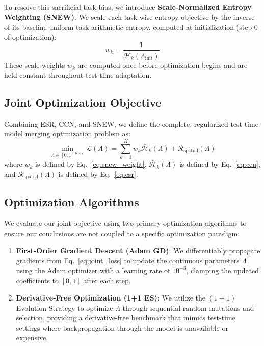 To resolve this sacrificial task bias, we introduce \textbf{Scale-Normalized Entropy Weighting (SNEW)}. We scale each task-wise entropy objective by the inverse of its baseline uniform task arithmetic entropy, computed at initialization (step $0$ of optimization):
\begin{equation}
\label{eq:snew_weight}
w_k = \frac{1}{\bar{\mathcal{H}}_k(\Lambda_{\text{init}})}
\end{equation}
These scale weights $w_k$ are computed once before optimization begins and are held constant throughout test-time adaptation. 

\subsection{Joint Optimization Objective}
Combining ESR, CCN, and SNEW, we define the complete, regularized test-time model merging optimization problem as:
\begin{equation}
\label{eq:joint_loss}
\min_{\Lambda \in [0, 1]^{K \times L}} \mathcal{L}(\Lambda) = \sum_{k=1}^K w_k \bar{\mathcal{H}}_k(\Lambda) + \mathcal{R}_{\text{spatial}}(\Lambda)
\end{equation}
where $w_k$ is defined by Eq.~\eqref{eq:snew_weight}, $\bar{\mathcal{H}}_k(\Lambda)$ is defined by Eq.~\eqref{eq:ccn}, and $\mathcal{R}_{\text{spatial}}(\Lambda)$ is defined by Eq.~\eqref{eq:esr}.

\subsection{Optimization Algorithms}
We evaluate our joint objective using two primary optimization algorithms to ensure our conclusions are not coupled to a specific optimization paradigm:
\begin{enumerate}
    \item \textbf{First-Order Gradient Descent (Adam GD)}: We differentiably propagate gradients from Eq.~\eqref{eq:joint_loss} to update the continuous parameters $\Lambda$ using the Adam optimizer with a learning rate of $10^{-3}$, clamping the updated coefficients to $[0, 1]$ after each step.
    \item \textbf{Derivative-Free Optimization (1+1 ES)}: We utilize the $(1+1)$ Evolution Strategy \cite{hansen2016cma} to optimize $\Lambda$ through sequential random mutations and selection, providing a derivative-free benchmark that mimics test-time settings where backpropagation through the model is unavailable or expensive.
\end{enumerate}